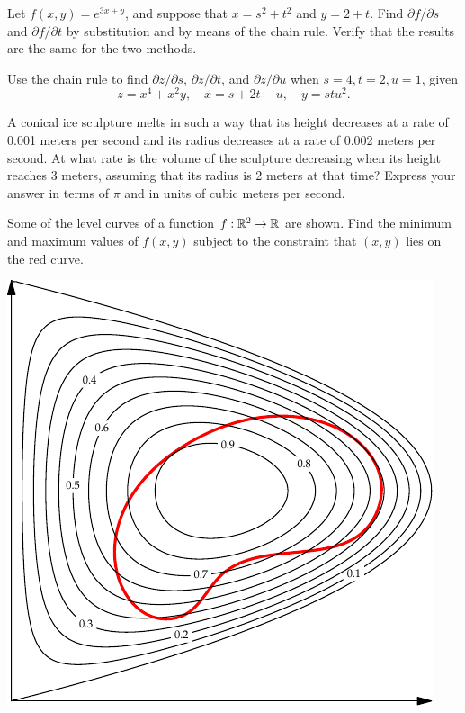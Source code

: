 \documentclass{watsonbook}
\begin{document}

\begin{aexercise}
  Let $f(x,y)=e^{3x+y}$, and suppose that $x=s^2+t^2$ and $y=2+t$. Find $\partial f/\partial s$ and $\partial f/\partial t$ by substitution and by means of the chain rule. Verify that the results are the same for the two methods. 
\end{aexercise}


\begin{aexercise}
  Use the chain rule to find $\partial z/\partial s$, $\partial
  z/\partial t$, and $\partial z/\partial u$ when $s=4, t = 2, u=1$, given 
  \[
    z = x^4 + x^2y, \quad x = s + 2t - u, \quad y = stu^2.
  \]
\end{aexercise}

\begin{aexercise}
  A conical ice sculpture melts in such a way that its height decreases at a rate of 0.001 meters per second and its radius decreases at a rate of 0.002 meters per second. At what rate is the volume of the sculpture decreasing when its height reaches 3 meters, assuming that its radius is 2 meters at that time? Express your answer in terms of $\pi$ and  in units of cubic meters per second. 
\end{aexercise}


\begin{aexercise}
  Some of the level curves of a function $f: \mathbb{R}^2 \to \mathbb{R}$ are
  shown. Find the minimum and maximum values of $f(x,y)$ subject to
  the constraint that $(x,y)$ lies on the red curve.
  \begin{center}
    \includegraphics{exercisefigures/lagrange_exercise} 
  \end{center}
\end{aexercise}
\end{document}
